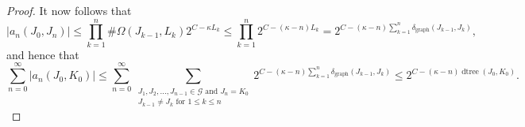 \documentclass[10pt,a4paper]{amsart}
\begin{document}
\begin{proof}
It now follows that
\[
\left\vert a_{n}\left(  J_{0},J_{n}\right)  \right\vert \leq\prod_{k=1}%
^{n}\#\Omega\left(  J_{k-1},L_{k}\right)  2^{C-\kappa L_{k}}\leq\prod
_{k=1}^{n}2^{C-\left(  \kappa-n\right)  L_{k}}=2^{C-\left(  \kappa-n\right)
\sum_{k=1}^{n}\delta_{\operatorname*{graph}}\left(  J_{k-1},J_{k}\right)  },
\]
and hence that%
\[
\sum_{n=0}^{\infty}\left\vert a_{n}\left(  J_{0},K_{0}\right)  \right\vert
\leq\sum_{n=0}^{\infty}\sum_{\substack{J_{1},J_{2},...,J_{n-1}\in
\mathcal{G}\text{ and }J_{n}=K_{0}\\J_{k-1}\neq J_{k}\text{ for }1\leq k\leq
n}}2^{C-\left(  \kappa-n\right)  \sum_{k=1}^{n}\delta_{\operatorname*{graph}%
}\left(  J_{k-1},J_{k}\right)  }\leq2^{C-\left(  \kappa-n\right)
\operatorname*{dtree}\left(  J_{0},K_{0}\right)  }.
\]

\end{proof}
\end{document}
